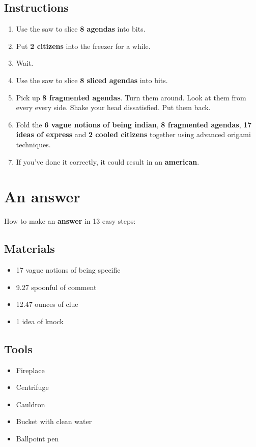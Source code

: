 \documentclass{article}
\begin{document}
\subsection{Instructions}\begin{enumerate}
\item 
Use the saw to slice \textbf{8 agendas} into bits.
\item 
Put \textbf{2 citizens} into the freezer for a while.
\item 
Wait.
\item 
Use the saw to slice \textbf{8 sliced agendas} into bits.
\item 
Pick up \textbf{8 fragmented agendas}. Turn them around. Look at them from every every side. Shake your head dissatisfied. Put them back.
\item 
Fold the \textbf{6 vague notions of being indian}, \textbf{8 fragmented agendas}, \textbf{17 ideas of express} and \textbf{2 cooled citizens} together using advanced origami techniques.
\item 
If you've done it correctly, it could result in an \textbf{american}.
\end{enumerate}
\newpage
\section{An answer}How to make an \textbf{answer} in 13 easy steps:

\subsection{Materials}\begin{itemize}
\item 
17 vague notions of being specific
\item 
9.27 spoonful of comment
\item 
12.47 ounces of clue
\item 
1 idea of knock
\end{itemize}
\subsection{Tools}\begin{itemize}
\item 
Fireplace
\item 
Centrifuge
\item 
Cauldron
\item 
Bucket with clean water
\item 
Ballpoint pen
\end{itemize}
\end{document}

